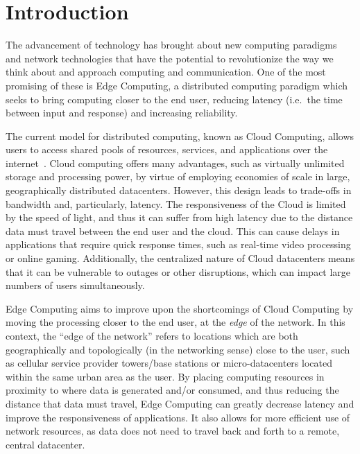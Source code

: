 \section{Introduction}


The advancement of technology has brought about new computing paradigms and network technologies that have the potential to revolutionize the way we think about and approach computing and communication.
One of the most promising of these is Edge Computing, a distributed computing paradigm which seeks to bring computing closer to the end user, reducing latency (i.e.\ the time between input and response) and increasing reliability.

The current model for distributed computing, known as Cloud Computing, allows users to access shared pools of resources, services, and applications over the internet~\cite{gai2012towards}.
Cloud computing offers many advantages, such as virtually unlimited storage and processing power, by virtue of employing economies of scale in large, geographically distributed datacenters.
However, this design leads to trade-offs in bandwidth and, particularly, latency.
The responsiveness of the Cloud is limited by the speed of light, and thus it can suffer from high latency due to the distance data must travel between the end user and the cloud.
This can cause delays in applications that require quick response times, such as real-time video processing or online gaming.
Additionally, the centralized nature of Cloud datacenters means that it can be vulnerable to outages or other disruptions, which can impact large numbers of users simultaneously.

Edge Computing aims to improve upon the shortcomings of Cloud Computing by moving the processing closer to the end user, at the \emph{edge} of the network.
In this context, the ``edge of the network'' refers to locations which are both geographically and topologically (in the networking sense) close to the user, such as cellular service provider towers/base stations or micro-datacenters located within the same urban area as the user.
By placing computing resources in proximity to where data is generated and/or consumed, and thus reducing the distance that data must travel, Edge Computing can greatly decrease latency and improve the responsiveness of applications.
It also allows for more efficient use of network resources, as data does not need to travel back and forth to a remote, central datacenter.

